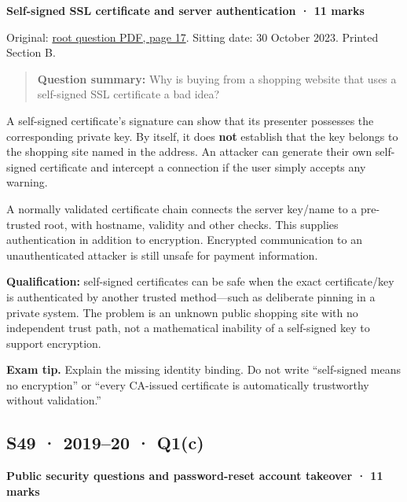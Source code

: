 \documentclass[11pt,a4paper]{article}
\begin{document}
\textbf{Self-signed SSL certificate and server authentication · 11 marks}


Original: \href{../../CSE405-Security_Merged.pdf\#page=17}{root question PDF,\allowbreak{} page 17}. Sitting date: 30 October 2023. Printed Section B.



\begin{quote}\small

\textbf{Question summary:} Why is buying from a shopping website that uses a self-signed SSL certificate a bad idea?



\end{quote}

A self-signed certificate’s signature can show that its presenter possesses the corresponding private key. By itself,\allowbreak{} it does \textbf{not} establish that the key belongs to the shopping site named in the address. An attacker can generate their own self-signed certificate and intercept a connection if the user simply accepts any warning.


A normally validated certificate chain connects the server key/\allowbreak{}name to a pre-trusted root,\allowbreak{} with hostname,\allowbreak{} validity and other checks. This supplies authentication in addition to encryption. Encrypted communication to an unauthenticated attacker is still unsafe for payment information.


\textbf{Qualification:} self-signed certificates can be safe when the exact certificate/\allowbreak{}key is authenticated by another trusted method—such as deliberate pinning in a private system. The problem is an unknown public shopping site with no independent trust path,\allowbreak{} not a mathematical inability of a self-signed key to support encryption.



{\color{ForestGreen}\textbf{Exam tip.} Explain the missing identity binding. Do not write “self-signed means no encryption” or “every CA-issued certificate is automatically trustworthy without validation.”}




\clearpage
\subsection{S49 · 2019–20 · Q1(c)}\label{s49}

\textbf{Public security questions and password-reset account takeover · 11 marks}
\end{document}

